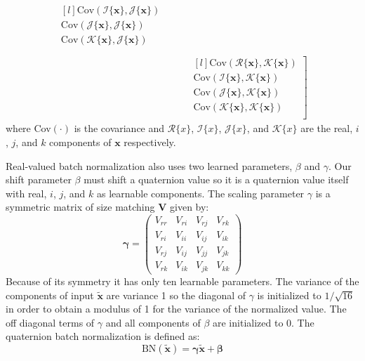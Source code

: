 \begin{align}
\begin{matrix*}[l]
\mbox{Cov}(\mathscr{I}\{\textbf{x}\}, \mathscr{J}\{\textbf{x}\}) \\
\mbox{Cov}(\mathscr{J}\{\textbf{x}\}, \mathscr{J}\{\textbf{x}\}) \\
\mbox{Cov}(\mathscr{K}\{\textbf{x}\}, \mathscr{J}\{\textbf{x}\}) \\
\end{matrix*} \nonumber \\
&~~~~~~~~ \left.
\begin{matrix*}[l]
\mbox{Cov}(\mathscr{R}\{\textbf{x}\}, \mathscr{K}\{\textbf{x}\}) \\
\mbox{Cov}(\mathscr{I}\{\textbf{x}\}, \mathscr{K}\{\textbf{x}\}) \\
\mbox{Cov}(\mathscr{J}\{\textbf{x}\}, \mathscr{K}\{\textbf{x}\}) \\
\mbox{Cov}(\mathscr{K}\{\textbf{x}\}, \mathscr{K}\{\textbf{x}\}) \\
\end{matrix*}  \right]
\label{eq:V4d}
\end{align}
where Cov$(\cdot)$ is the covariance and $\mathscr{R}\{x\}$, $\mathscr{I}\{x\}$, $\mathscr{J}\{x\}$, and $\mathscr{K}\{x\}$ are the real, $i$, $j$, and $k$ components of $\textbf{x}$ respectively.

Real-valued batch normalization also uses two learned parameters, $\beta$ and $\gamma$. 
Our shift parameter {\boldmath$\beta$} must shift a quaternion value so it is a quaternion value itself with real, $i$, $j$, and $k$ as learnable components. 
The scaling parameter {\boldmath$\gamma$} is a symmetric matrix of size matching $\textbf{V}$ given by:
\begin{equation}
\mathbf{\gamma}
=
\left( 
\begin{array}{cccc}
V_{rr} & V_{ri} & V_{rj} & V_{rk} \\
V_{ri} & V_{ii} & V_{ij} & V_{ik} \\
V_{rj} & V_{ij} & V_{jj} & V_{jk} \\
V_{rk} & V_{ik} & V_{jk} & V_{kk}
\end{array}
\right)
\label{eq:gamma}
\end{equation}
Because of its symmetry it has only ten learnable parameters. 
The variance of the components of input $\tilde{\textbf{x}}$ are variance 1 so the diagonal of {\boldmath$\gamma$} is initialized to $1/\sqrt{16}$ in order to obtain a modulus of 1 for the variance of the normalized value. 
The off diagonal terms of {\boldmath$\gamma$} and all components of {\boldmath$\beta$} are initialized to 0.
The quaternion batch normalization is defined as:
\begin{equation}
\mbox{BN}(\tilde{\textbf{x}}) = \mathbf{\gamma}\tilde{\textbf{x}} + \mathbf{\beta}
\label{eq:qbn}
\end{equation}


